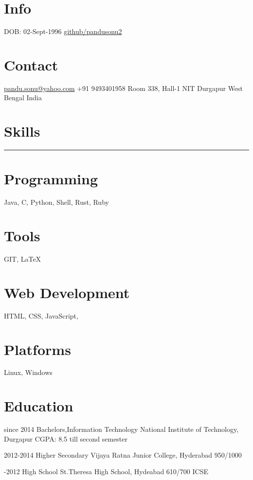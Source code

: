 \documentclass[]{friggeri-cv-a4}
\begin{document}


\begin{aside}
\section{Info}
DOB: 02-Sept-1996
\href{http://github.com/pandusonu2}{github/pandusonu2}
\section{Contact}
\href{mailto:pandu.sonu@yahoo.com}{pandu.sonu@yahoo.com}
+91 9493401958
Room 338, Hall-1
NIT Durgapur
West Bengal
India
\section{Skills}
\noindent\rule{3cm}{0.5pt}
\section{Programming}
Java, C, Python, Shell, Rust, Ruby
\section{Tools}
GIT, \LaTeX
\section{Web Development}
HTML, CSS, JavaScript,
\section{Platforms}
Linux, Windows
\end{aside}


\section{Education}

\begin{entrylist}

\entry
{since 2014}
{Bachelors,{\normalfont Information Technology}}
{National Institute of Technology, Durgapur}
{CGPA: 8.5 till second semester}
{}

\entry
{2012-2014}
{Higher Secondary}
{Vijaya Ratna Junior College, Hyderabad}
{950/1000}
{}

\entry
{-2012}
{High School}
{St.Theresa High School, Hydeabad}
{610/700 ICSE}
{}

\end{entrylist}
\end{document}
